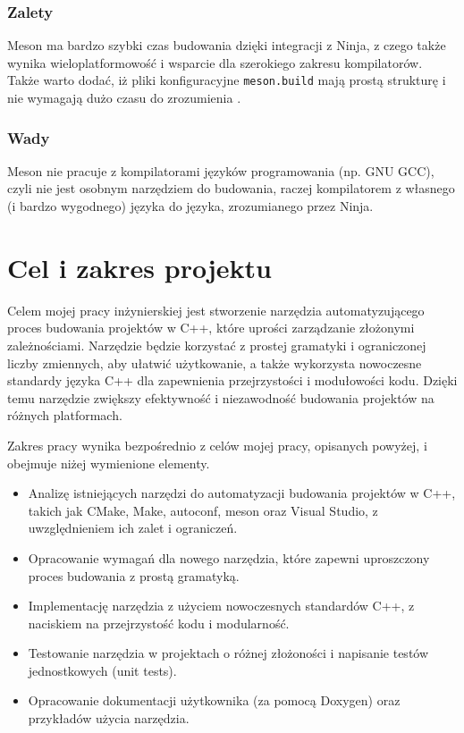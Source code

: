 \subsubsection{Zalety}
Meson ma bardzo szybki czas budowania dzięki integracji z Ninja, z czego także wynika wieloplatformowość i wsparcie dla szerokiego zakresu kompilatorów. Także warto dodać, iż  pliki konfiguracyjne \texttt{meson.build} mają prostą strukturę i nie wymagają dużo czasu do zrozumienia \cite{meson-sample}.

\subsubsection{Wady}
Meson nie pracuje z kompilatorami języków programowania (np. GNU GCC), czyli nie jest osobnym narzędziem do budowania, raczej kompilatorem z własnego (i bardzo wygodnego) języka do języka, zrozumianego przez Ninja.

\section{Cel i zakres projektu}
Celem mojej pracy inżynierskiej jest stworzenie narzędzia automatyzującego proces budowania projektów w C++, które uprości zarządzanie złożonymi zależnościami. Narzędzie będzie korzystać z prostej gramatyki i ograniczonej liczby zmiennych, aby ułatwić użytkowanie, a także wykorzysta nowoczesne standardy języka C++ dla zapewnienia przejrzystości i modułowości kodu. Dzięki temu narzędzie zwiększy efektywność i niezawodność budowania projektów na różnych platformach.

Zakres pracy wynika bezpośrednio z celów mojej pracy, opisanych powyżej, i obejmuje niżej wymienione elementy.
\begin{itemize}
    \item Analizę istniejących narzędzi do automatyzacji budowania projektów w C++, takich jak CMake, Make, autoconf, meson oraz Visual Studio, z uwzględnieniem ich zalet i ograniczeń.
    \item Opracowanie wymagań dla nowego narzędzia, które zapewni uproszczony proces budowania z prostą gramatyką.
    \item Implementację narzędzia z użyciem nowoczesnych standardów C++, z naciskiem na przejrzystość kodu i modularność.
    \item Testowanie narzędzia w projektach o różnej złożoności i napisanie testów jednostkowych (unit tests).
    \item Opracowanie dokumentacji użytkownika (za pomocą Doxygen) oraz przykładów użycia narzędzia.
\end{itemize}